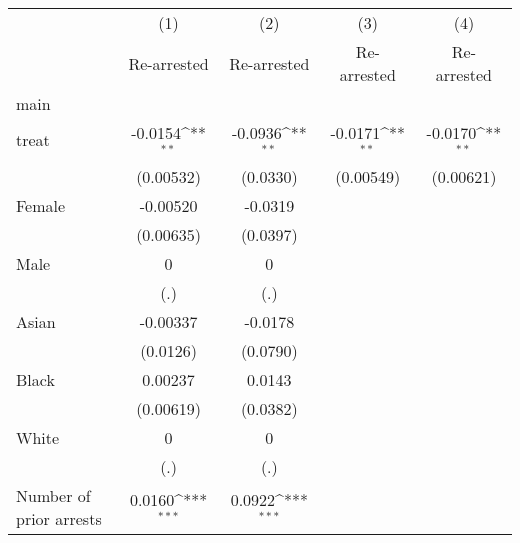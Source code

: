 {
\def\sym#1{\ifmmode^{#1}\else\(^{#1}\)\fi}
\begin{tabular}{l*{4}{c}}
\toprule
                    &\multicolumn{1}{c}{(1)}&\multicolumn{1}{c}{(2)}&\multicolumn{1}{c}{(3)}&\multicolumn{1}{c}{(4)}\\
                    &\multicolumn{1}{c}{Re-arrested}&\multicolumn{1}{c}{Re-arrested}&\multicolumn{1}{c}{Re-arrested}&\multicolumn{1}{c}{Re-arrested}\\
\midrule
main                &                     &                     &                     &                     \\
treat               &     -0.0154\sym{**} &     -0.0936\sym{**} &     -0.0171\sym{**} &     -0.0170\sym{**} \\
                    &   (0.00532)         &    (0.0330)         &   (0.00549)         &   (0.00621)         \\
\addlinespace
Female              &    -0.00520         &     -0.0319         &                     &                     \\
                    &   (0.00635)         &    (0.0397)         &                     &                     \\
\addlinespace
Male                &           0         &           0         &                     &                     \\
                    &         (.)         &         (.)         &                     &                     \\
\addlinespace
Asian               &    -0.00337         &     -0.0178         &                     &                     \\
                    &    (0.0126)         &    (0.0790)         &                     &                     \\
\addlinespace
Black               &     0.00237         &      0.0143         &                     &                     \\
                    &   (0.00619)         &    (0.0382)         &                     &                     \\
\addlinespace
White               &           0         &           0         &                     &                     \\
                    &         (.)         &         (.)         &                     &                     \\
\addlinespace
Number of prior arrests&      0.0160\sym{***}&      0.0922\sym{***}&                     &                     \\

\end{tabular}}
